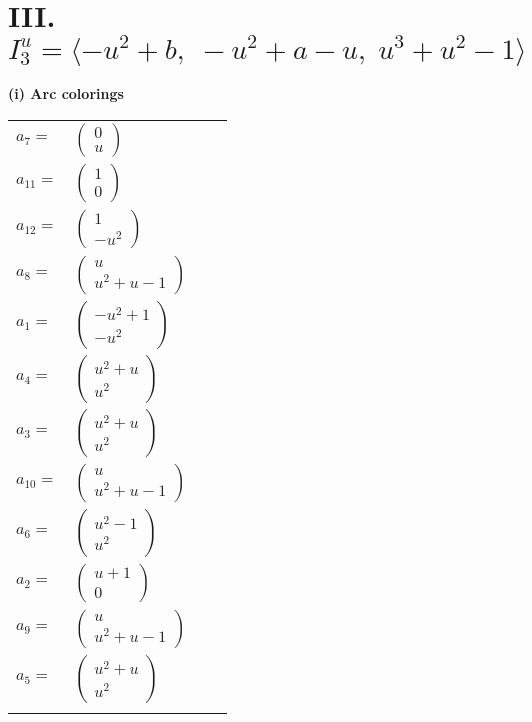 \documentclass[1p]{elsarticle_modified}
\theoremstyle{definition}
\begin{document}
\centering \section*{III. $I^u_{3}= \langle - u^2+b,\;- u^2+a- u,\;u^3+u^2-1 \rangle$}
\flushleft \textbf{(i) Arc colorings}\\
\begin{tabular}{m{7pt} m{180pt} m{7pt} m{180pt} }
\flushright $a_{7}=$&$\begin{pmatrix}0\\u\end{pmatrix}$ \\
\flushright $a_{11}=$&$\begin{pmatrix}1\\0\end{pmatrix}$ \\
\flushright $a_{12}=$&$\begin{pmatrix}1\\- u^2\end{pmatrix}$ \\
\flushright $a_{8}=$&$\begin{pmatrix}u\\u^2+u-1\end{pmatrix}$ \\
\flushright $a_{1}=$&$\begin{pmatrix}- u^2+1\\- u^2\end{pmatrix}$ \\
\flushright $a_{4}=$&$\begin{pmatrix}u^2+u\\u^2\end{pmatrix}$ \\
\flushright $a_{3}=$&$\begin{pmatrix}u^2+u\\u^2\end{pmatrix}$ \\
\flushright $a_{10}=$&$\begin{pmatrix}u\\u^2+u-1\end{pmatrix}$ \\
\flushright $a_{6}=$&$\begin{pmatrix}u^2-1\\u^2\end{pmatrix}$ \\
\flushright $a_{2}=$&$\begin{pmatrix}u+1\\0\end{pmatrix}$ \\
\flushright $a_{9}=$&$\begin{pmatrix}u\\u^2+u-1\end{pmatrix}$ \\
\flushright $a_{5}=$&$\begin{pmatrix}u^2+u\\u^2\end{pmatrix}$\\&\end{tabular}
\end{document}
